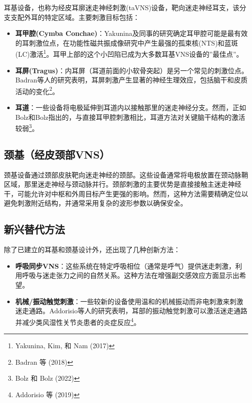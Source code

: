 \documentclass[
  Letterpaper,
]{scrbook}
\begin{document}
耳基设备，也称为经皮耳廓迷走神经刺激(taVNS)设备，靶向迷走神经耳支，该分支支配外耳的特定区域。主要刺激目标包括：

\begin{itemize}
\item
  \textbf{耳甲腔(Cymba
  Conchae)}：Yakunina及同事的研究确定耳甲腔可能是最有效的耳刺激位点，在功能性磁共振成像研究中产生最强的孤束核(NTS)和蓝斑(LC)激活\footnote{Yakunina,
    Kim, 和 Nam (2017)}。耳甲上部的这个小凹陷已成为大多数耳基VNS设备的''最佳点''。
\item
  \textbf{耳屏(Tragus)}：内耳屏（耳道前面的小软骨突起）是另一个常见的刺激位点。Badran等人的研究表明，耳屏刺激产生显著的神经生理效应，包括脑干和皮质活动的变化\footnote{Badran
    等 (2018)}。
\item
  \textbf{耳道}：一些设备将电极延伸到耳道内以接触那里的迷走神经分支。然而，正如Bolz和Bolz指出的，与直接耳甲腔刺激相比，耳道方法对关键脑干结构的激活较弱\footnote{Bolz
    和 Bolz (2022)}。
\end{itemize}

\subsection{颈基（经皮颈部VNS）}\label{ux9888ux57faux7ecfux76aeux9888ux90e8vns}

颈基设备通过颈部皮肤靶向迷走神经的颈部。这些设备通常将电极放置在颈动脉鞘区域，那里迷走神经与颈动脉并行。颈部刺激的主要优势是直接接触主迷走神经干，可能允许对中枢和外周目标产生更强的影响。然而，这种方法需要精确定位以避免刺激附近结构，并通常采用复杂的波形参数以确保安全。

\subsection{新兴替代方法}\label{ux65b0ux5174ux66ffux4ee3ux65b9ux6cd5}

除了已建立的耳基和颈基设计外，还出现了几种创新方法：

\begin{itemize}
\item
  \textbf{呼吸同步VNS}：这些系统在特定呼吸相位（通常是呼气）提供迷走刺激，利用呼吸与迷走张力之间的自然关系。这种方法在增强副交感效应方面显示出希望。
\item
  \textbf{机械/振动触觉刺激}：一些较新的设备使用温和的机械振动而非电刺激来刺激迷走通路。Addorisio等人的研究表明，耳部的振动触觉刺激可以激活迷走通路并减少类风湿性关节炎患者的炎症反应\footnote{Addorisio
    等 (2019)}。
\end{itemize}
\end{document}
